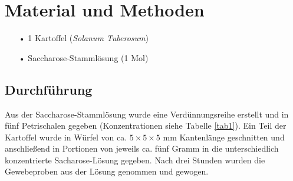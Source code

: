 \documentclass[11pt,a4paper,DIV=10,]{scrartcl}
\begin{document}
\section*{Material und Methoden}
\begin{enumerate}
	\item[•] 1 Kartoffel (\textit{Solanum Tuberosum})
	\item[•] Saccharose-Stammlösung (1 Mol)
\end{enumerate}
\subsection*{Durchführung}
Aus der Saccharose-Stammlösung wurde eine Verdünnungsreihe erstellt und in fünf Petrischalen gegeben (Konzentrationen siehe Tabelle \ref{tab1}). Ein Teil der Kartoffel wurde in Würfel von ca. $5\times5\times5$ mm Kantenlänge geschnitten und anschließend in Portionen von jeweils ca. fünf Gramm in die unterschiedlich konzentrierte Sacharose-Lösung gegeben. Nach drei Stunden wurden die Gewebeproben aus der Lösung genommen und gewogen.
\end{document}
